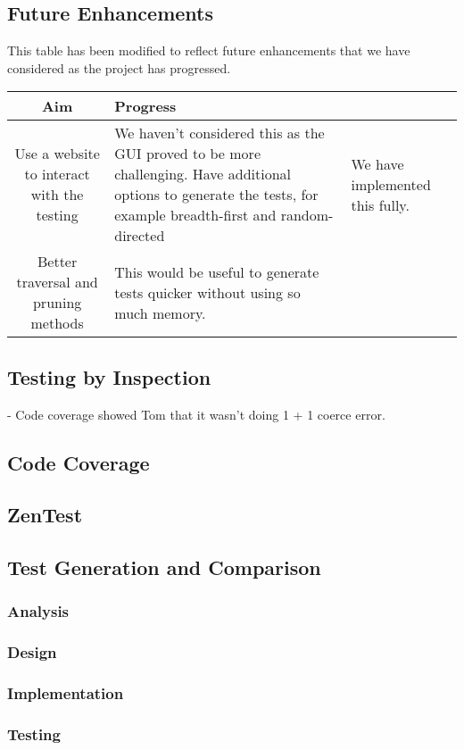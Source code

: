   \subsection{Future Enhancements}
    This table has been modified to reflect future enhancements that we have considered as the project has progressed.
    \begin{tabular}{| c | p{\colwidth} | p{\colwidth} |}
    \hline
    \textbf{Aim} & \textbf{Progress} \\
    \hline
    Use a website to interact with the testing &
    We haven't considered this as the GUI proved to be more challenging.
    \hline
    Have additional options to generate the tests, for example breadth-first and random-directed &
    We have implemented this fully. \\
    \hline
    Better traversal and pruning methods &
    This would be useful to generate tests quicker without using so much memory. \\
    \hline
    \end{tabular}

  \subsection{Testing by Inspection}
  - Code coverage showed Tom that it wasn't doing 1 + 1 coerce error.
  \subsection{Code Coverage}
  \subsection{ZenTest}
  \subsection{Test Generation and Comparison}
    \subsubsection{Analysis}
    \subsubsection{Design}
    \subsubsection{Implementation}
    \subsubsection{Testing}
